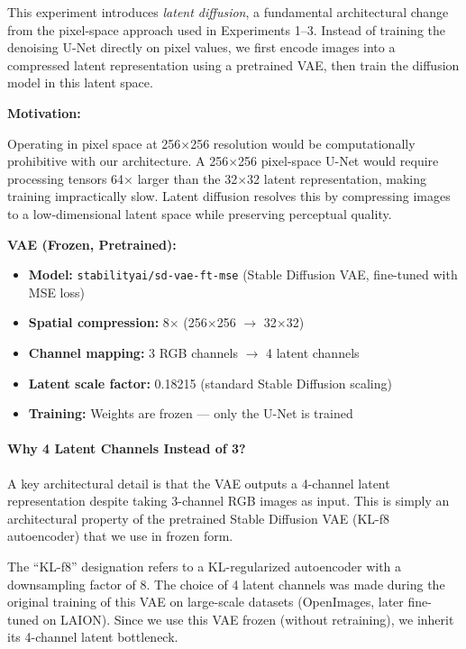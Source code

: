 This experiment introduces \emph{latent diffusion}, a fundamental architectural change from the pixel-space approach used in Experiments 1--3. Instead of training the denoising U-Net directly on pixel values, we first encode images into a compressed latent representation using a pretrained VAE, then train the diffusion model in this latent space.

\textbf{Motivation:}

Operating in pixel space at 256$\times$256 resolution would be computationally prohibitive with our architecture. A 256$\times$256 pixel-space U-Net would require processing tensors 64$\times$ larger than the 32$\times$32 latent representation, making training impractically slow. Latent diffusion resolves this by compressing images to a low-dimensional latent space while preserving perceptual quality.

\textbf{VAE (Frozen, Pretrained):}
\begin{itemize}
    \item \textbf{Model:} \texttt{stabilityai/sd-vae-ft-mse} (Stable Diffusion VAE, fine-tuned with MSE loss)
    \item \textbf{Spatial compression:} 8$\times$ (256$\times$256 $\rightarrow$ 32$\times$32)
    \item \textbf{Channel mapping:} 3 RGB channels $\rightarrow$ 4 latent channels
    \item \textbf{Latent scale factor:} 0.18215 (standard Stable Diffusion scaling)
    \item \textbf{Training:} Weights are frozen --- only the U-Net is trained
\end{itemize}

\paragraph{Why 4 Latent Channels Instead of 3?}

A key architectural detail is that the VAE outputs a 4-channel latent representation despite taking 3-channel RGB images as input. This is simply an architectural property of the pretrained Stable Diffusion VAE (KL-f8 autoencoder) that we use in frozen form.

The ``KL-f8'' designation refers to a KL-regularized autoencoder with a downsampling factor of 8. The choice of 4 latent channels was made during the original training of this VAE on large-scale datasets (OpenImages, later fine-tuned on LAION). Since we use this VAE frozen (without retraining), we inherit its 4-channel latent bottleneck.

